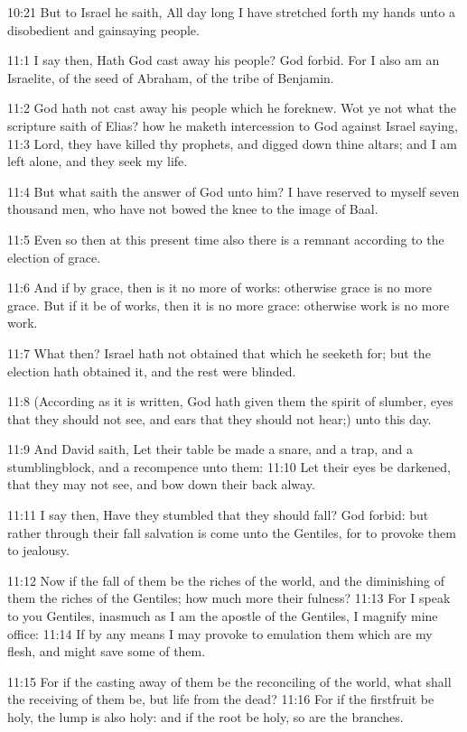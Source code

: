 10:21 But to Israel he saith, All day long I have stretched forth my hands unto a disobedient and gainsaying people.

11:1 I say then, Hath God cast away his people? God forbid. For I also am an Israelite, of the seed of Abraham, of the tribe of Benjamin.

11:2 God hath not cast away his people which he foreknew. Wot ye not what the scripture saith of Elias? how he maketh intercession to God against Israel saying, 11:3 Lord, they have killed thy prophets, and digged down thine altars; and I am left alone, and they seek my life.

11:4 But what saith the answer of God unto him? I have reserved to myself seven thousand men, who have not bowed the knee to the image of Baal.

11:5 Even so then at this present time also there is a remnant according to the election of grace.

11:6 And if by grace, then is it no more of works: otherwise grace is no more grace. But if it be of works, then it is no more grace: otherwise work is no more work.

11:7 What then? Israel hath not obtained that which he seeketh for; but the election hath obtained it, and the rest were blinded.

11:8 (According as it is written, God hath given them the spirit of slumber, eyes that they should not see, and ears that they should not hear;) unto this day.

11:9 And David saith, Let their table be made a snare, and a trap, and a stumblingblock, and a recompence unto them: 11:10 Let their eyes be darkened, that they may not see, and bow down their back alway.

11:11 I say then, Have they stumbled that they should fall? God forbid: but rather through their fall salvation is come unto the Gentiles, for to provoke them to jealousy.

11:12 Now if the fall of them be the riches of the world, and the diminishing of them the riches of the Gentiles; how much more their fulness?  11:13 For I speak to you Gentiles, inasmuch as I am the apostle of the Gentiles, I magnify mine office: 11:14 If by any means I may provoke to emulation them which are my flesh, and might save some of them.

11:15 For if the casting away of them be the reconciling of the world, what shall the receiving of them be, but life from the dead?  11:16 For if the firstfruit be holy, the lump is also holy: and if the root be holy, so are the branches.

